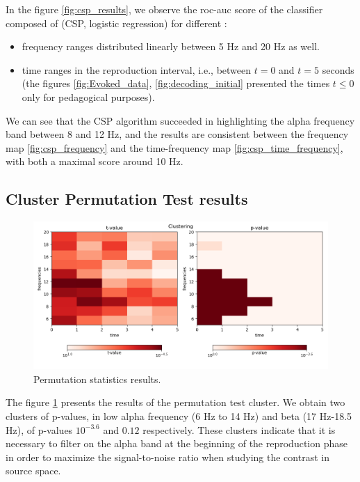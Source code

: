 
In the figure \ref{fig:csp_results}, we observe the roc-auc score of the classifier composed of (CSP, logistic regression) for different :

\begin{itemize}
    \item frequency ranges distributed linearly between 5 Hz and 20 Hz as well.
    \item time ranges in the reproduction interval, i.e., between $t=0$ and $t=5$ seconds (the figures \ref{fig:Evoked_data}, \ref{fig:decoding_initial} presented the times $t \leq 0$ only for pedagogical purposes).
\end{itemize}

We can see that the CSP algorithm succeeded in highlighting the alpha frequency band between 8 and 12 Hz, and the results are consistent between the frequency map \ref{fig:csp_frequency} and the time-frequency map \ref{fig:csp_time_frequency}, with both a maximal score around 10 Hz.

\subsection{Cluster Permutation Test results}

\begin{figure}[ht]
    \centering
    \includegraphics[width=15cm]{images_report/sensor/csp_permutation_res/permutations_test.png}
    \caption[Permutation statistics results.]%
    {Permutation statistics results.}
    \label{permutation_statistics_results}
\end{figure}

The figure \ref{permutation_statistics_results} presents the results of the permutation test cluster. We obtain two clusters of p-values, in low alpha frequency (6 Hz to 14 Hz) and beta (17 Hz-18.5 Hz), of p-values $10^{-3.6}$ and $0.12$ respectively. These clusters indicate that it is necessary to filter on the alpha band at the beginning of the reproduction phase in order to maximize the signal-to-noise ratio when studying the contrast in source space.

